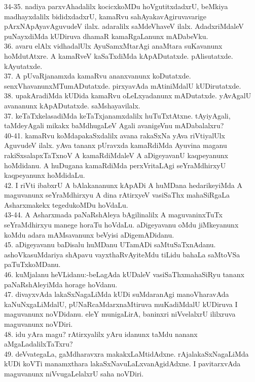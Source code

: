 \documentclass{article}
\begin{document}
34-35. nadiya parxvAhadalilx kocicxkoMDu hoVgutitxdadxrU, beMkiya madhayxdalilx bididxdadxrU, kamaRvu sahAyakavAgiruvavarige pArxNApAyavAguvudeV ilalx. adaralilx saMdeVhaveV ilalx. AdadxriMdaleV puNayxdiMda kUDiruva dhamaR kamaRgaLanunx mADabeVku.\\
36. avaru elAlx vidhadalUlx AyuSamxMtarAgi anaMtara suKavanunx hoMdutAtxre. A kamaRveV kaSaTxdiMda kApADutatxde. pAlisutatxde. kAyutatxde.\\
37. A pUvaRjanamxda kamaRvu ananxvanunx koDutatxde. senxVhavanunxMTumADutatxde. pirxyavAda mAtiniMdalU kUDirutatxde.\\
38. upakAradiMda kUDida kamaRvu oLeLxyadanunx mADutatxde. yAvAgalU avananunx kApADutatxde. saMshayavilalx.\\
37. keTaTxkelasadiMda keTaTxjanamxdalilx huTuTxtAtxne. tAyiyAgali, taMdeyAgali mikakx baMdhugaLeV Agali avanigeVnu mADabalalxru?\\
40-41. kamaRvu koMdapakaSxdalilx avana rakaSxNa yAva riVtiyalUlx AguvudeV ilalx. yAva tananx pUravxda kamaRdiMda Ayuvina maganu rakiSxsalapxTaTxnoV A kamaRdiMdaleV A aDigeyavanU kaqpeyanunx hoMdidanu. A huDugana kamaRdiMda perxVritaLAgi seYraMdhirxyU kaqpeyanunx hoMdidaLu.\\
42. I riVti ibabxrU A bAlakananunx kApADi A huMDana hedarikeyiMda A maguvanunx seYraMdhirxyu A dina rAtirxyeV vasiSaThx mahaSiRgaLa Asharxmakekx tegedukoMDu hoVdaLu.\\
43-44. A Asharxmada paNaRshAleya bAgilinalilx A maguvaninxTuTx seYraMdhirxyu manege horaTu hoVdaLu. aDigeyavanu oMdu jiMkeyanunx koMdu adara mAMsavanunx beVyisi aDigemADidanu.\\
45. aDigeyavanu baDisalu huMDanu UTamADi saMtuSaTxnAdanu. ashoVkasuMdariya shApavu vayxthaRvAyiteMdu tiLidu bahaLa saMtoVSa paTuTxkoMDanu.\\
46. kuMjalanu heVLidanu:-beLagAda kUDaleV vasiSaThxmahaSiRyu tananx paNaRshAleyiMda horage hoVdanu.\\
47. divayxvAda lakaSxNagaLiMda kUDi suMdaranAgi manoVharavAda kaNuNxgaLiMdalU, pUNaRcaMdarxnaMtiruva muKadiMdalU kUDiruva I maguvanunx noVDidanu. eleY munigaLirA, baninxri niVvelalxrU ililxruva maguvanunx noVDiri.\\
48. idu yAra magu? rAtirxyalilx yAru idanunx taMdu nananx aMgaLadalilxTaTxru?\\
49. deVvategaLa, gaMdharavxra makakxLaMtidAdxne. rAjalakaSxNagaLiMda kUDi koVTi manamxthara lakaSxNavuLaLxvanAgidAdxne. I pavitarxvAda maguvanunx niVvugaLelalxrU saha noVDiri.\\
\end{document}
